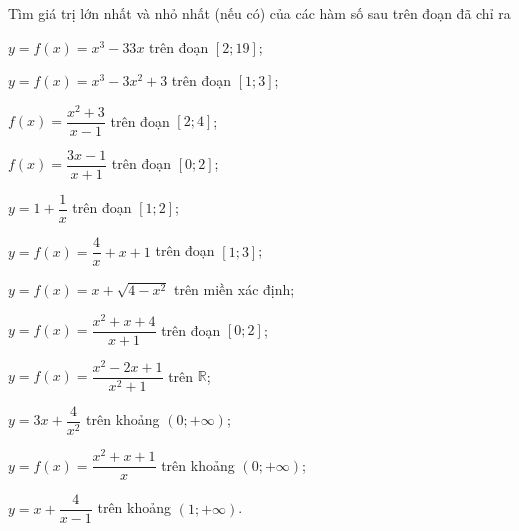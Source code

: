 \begin{bt}%
	Tìm giá  trị lớn nhất và nhỏ nhất (nếu có) của các hàm số sau trên đoạn đã chỉ ra
	\begin{listEX}[2]
		\item $y=f(x)=x^3-33x$ trên  đoạn $[2;19]$;
		\item $y=f(x)=  x^3-3x^2+3$ trên đoạn $[1;3]$;
		 \item $f(x)=\dfrac{x^2 +3}{x-1}$ trên đoạn $[2;4]$;
		 \item $f(x)=\dfrac{3x-1}{x+1}$ trên đoạn $[0;2]$;
		\item  $y=1+\dfrac{1}{x}$ trên đoạn $[1;2]$;
		\item  $y=f(x)=\dfrac{4}{x}+x+1$ trên đoạn $[1;3]$;
		\item $y=f(x)=x+\sqrt{4-x^2}$ trên miền xác định; 
		 \item $y=f(x)=\dfrac{x^2+x+4}{x+1}$ trên đoạn $[0;2]$;
		\item $y=f(x)=\dfrac{x^2-2x+1}{x^2+1}$  trên $\mathbb{R}$;
		\item $y=3x+\dfrac{4}{x^2}$  trên khoảng $(0;+\infty)$;
		\item $y=f(x)=\dfrac{x^2+x+1}{x}$ trên khoảng  $(0;+\infty)$;
		\item $y=x+\dfrac{4}{x-1}$ trên khoảng  $(1;+\infty)$.
	\end{listEX}
\end{bt}
